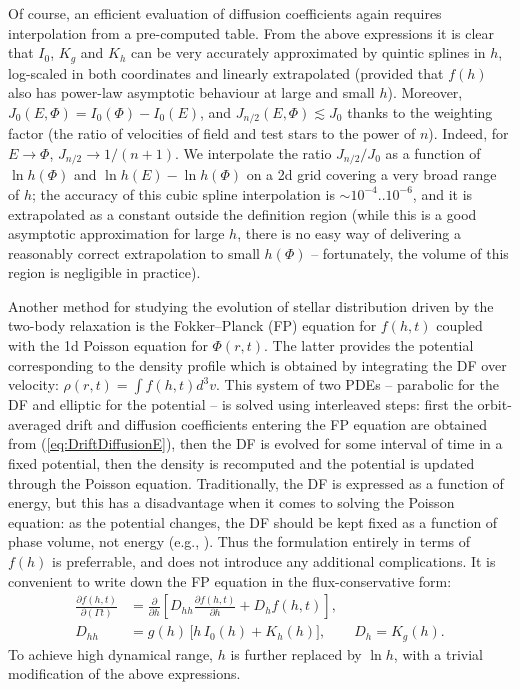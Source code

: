 \documentclass[12pt]{article}
\renewcommand{\d}{\partial}
\begin{document}
Of course, an efficient evaluation of diffusion coefficients again requires interpolation from a pre-computed table. From the above expressions it is clear that $I_0$, $K_g$ and $K_h$ can be very accurately approximated by quintic splines in $h$, log-scaled in both coordinates and linearly extrapolated (provided that $f(h)$ also has power-law asymptotic behaviour at large and small $h$). 
Moreover, $J_0(E,\Phi) = I_0(\Phi)-I_0(E)$, and $J_{n/2}(E,\Phi)\lesssim J_0$ thanks to the weighting factor (the ratio of velocities of field and test stars to the power of $n$). Indeed, for $E\to\Phi$, $J_{n/2} \to 1/(n+1)$. We interpolate the ratio $J_{n/2}/J_0$ as a function of $\ln h(\Phi)$ and $\ln h(E)-\ln h(\Phi)$ on a 2d grid covering a very broad range of $h$; the accuracy of this cubic spline interpolation is $\sim 10^{-4}..10^{-6}$, and it is extrapolated as a constant outside the definition region (while this is a good asymptotic approximation for large $h$, there is no easy way of delivering a reasonably correct extrapolation to small $h(\Phi)$ -- fortunately, the volume of this region is negligible in practice).

Another method for studying the evolution of stellar distribution driven by the two-body relaxation is the Fokker--Planck (FP) equation for $f(h,t)$ coupled with the 1d Poisson equation for $\Phi(r,t)$. The latter provides the potential corresponding to the density profile which is obtained by integrating the DF over velocity: $\rho(r,t)=\int f(h,t) d^3v$. This system of two PDEs -- parabolic for the DF and elliptic for the potential -- is solved using interleaved steps: first the orbit-averaged drift and diffusion coefficients entering the FP equation are obtained from (\ref{eq:DriftDiffusionE}), then the DF is evolved for some interval of time in a fixed potential, then the density is recomputed and the potential is updated through the Poisson equation.
Traditionally, the DF is expressed as a function of energy, but this has a disadvantage when it comes to solving the Poisson equation: as the potential changes, the DF should be kept fixed as a function of phase volume, not energy (e.g., \cite{Cohn1980}). Thus the formulation entirely in terms of $f(h)$ is preferrable, and does not introduce any additional complications. It is convenient to write down the FP equation in the flux-conservative form:
\begin{align}
\frac{\d f(h,t)}{\d (\Gamma t)} &= \frac{\d}{\d h} \left[ D_{hh} \frac{\d f(h,t)}{\d h} + D_h f(h,t) \right] , \label{eq:FokkerPlanck} \\
D_{hh} &= g(h)\,\big[ h\, I_0(h) + K_h(h) \big], \qquad D_h = K_g(h).  \label{eq:FokkerPlanckCoefs}
\end{align}
To achieve high dynamical range, $h$ is further replaced by $\ln h$, with a trivial modification of the above expressions.
\end{document}
